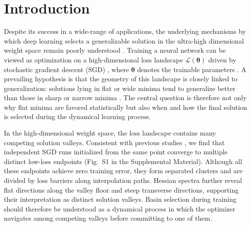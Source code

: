 \documentclass[aps,prx,reprint,superscriptaddress,longbibliography,nofootinbib,floatfix]{revtex4-2}
\begin{document}
\maketitle

\section{Introduction}
Despite its success in a wide-range of applications, the underlying mechanisms by which deep learning selects a generalizable solution in the ultra-high dimensional weight space remain poorly understood \cite{lecunDeepLearning2015,levineMachineLearningMeets2024a}. Training a neural network can be viewed as optimization on a high-dimensional loss landscape $\mathcal{L}(\bm{\theta})$ driven by stochastic gradient descent (SGD) \cite{robbinsStochasticApproximationMethod1951,bottouLargeScaleMachineLearning2010}, where $\bm{\theta}$ denotes the trainable parameters \cite{liuLossLandscapesOptimization2022,sunGlobalLandscapeNeural2020}. A prevailing hypothesis is that the geometry of this landscape is closely linked to generalization: solutions lying in flat or wide minima tend to generalize better than those in sharp or narrow minima \cite{hochreiterFlatMinima1997,liVisualizingLossLandscape2018,jastrzebskiThreeFactorsInfluencing2018,wuHowSGDSelects2018,keskarLargeBatchTrainingDeep2017,chenSimpleConnectionLoss2024,fengActivityWeightDuality2023}. The central question is therefore not only why flat minima are favored statistically but also when and how the final solution is selected during the dynamical learning process. 

In the high-dimensional weight space, the loss landscape contains many competing solution valleys. Consistent with previous studies \cite{choromanskaLossSurfacesMultilayer2015,liVisualizingLossLandscape2018,fortLargeScaleStructure2019,garipovLossSurfacesMode2018,wuHowSGDSelects2018,ghorbaniInvestigationNeuralNet2019,chaudhariEntropySGDBiasingGradient2019}, we find that independent SGD runs initialized from the same point converge to multiple distinct low-loss endpoints (Fig.~S1 in the Supplemental Material). Although all these endpoints achieve zero training error, they form separated clusters and are divided by loss barriers along interpolation paths. Hessian spectra further reveal flat directions along the valley floor and steep transverse directions, supporting their interpretation as distinct solution valleys. Basin selection during training should therefore be understood as a dynamical process in which the optimizer navigates among competing valleys before committing to one of them.
\end{document}

